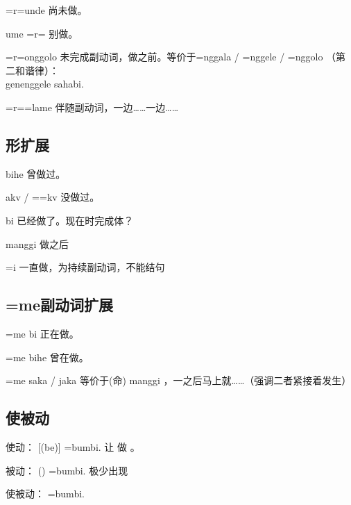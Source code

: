 \begin{des}
    \item[\V=r=\AIfina unde] 尚未做。
    \item[ume \V=r=\AIfina] 别做\V 。
    \item[\V=r=\AIfina onggolo] 未完成副动词，做\V 之前。等价于\V=nggala / \V=nggele / \V=nggolo （第二和谐律）：\\
        genenggele  sahabi.
    \item[\V=r=\AImedi=lame] 伴随副动词，一边……一边……
\end{des}

\subsection{形扩展}

\begin{des}
    \item[\V\HAfina bihe] 曾做过。
    \item[\V\HAfina akv / \V=\HAmedi=kv] 没做过。
    \item[\V\HAfina bi] 已经做了\V 。现在时完成体？ 
    \item[\V\HAfina manggi] 做\V 之后
    \item[\V\HAmedi=i] 一直做，为持续副动词，不能结句
\end{des}

\subsection{=me副动词扩展}

\begin{des}
    \item[\V=me bi] 正在做。
    \item[\V=me bihe] 曾在做。
    \item[\V=me saka / jaka] 等价于\V (命) manggi ，一\V 之后马上就……（强调二者紧接着发生）
\end{des}

\subsection{使被动}

使动：\A \B {} [\C (be)] \V=bumbi. \A 让 \B 做 \V \C 。

被动：\A \B {} (\C) \V=bumbi. \C 极少出现

使被动：\A \B {} \C {} \V=bumbi. 

